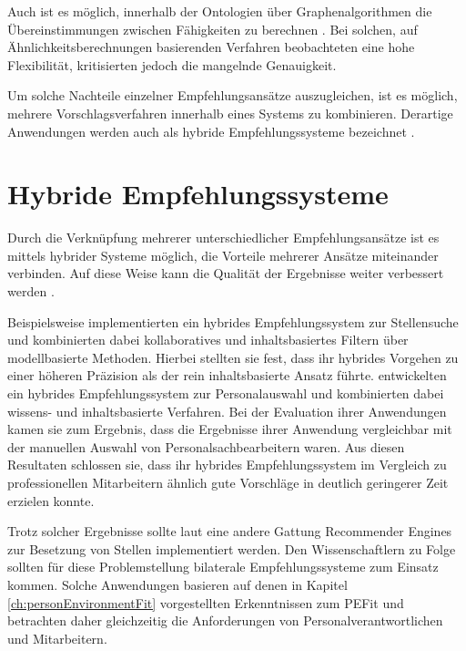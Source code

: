 Auch ist es möglich, innerhalb der Ontologien über Graphenalgorithmen die Übereinstimmungen zwischen Fähigkeiten zu berechnen \cite[S. 1f.]{balachander:2018}. Bei solchen, auf Ähnlichkeitsberechnungen basierenden Verfahren beobachteten \textcite[S. 4]{bianchini:2008} eine hohe Flexibilität, kritisierten jedoch die mangelnde Genauigkeit.

Um solche Nachteile einzelner Empfehlungsansätze auszugleichen, ist es möglich, mehrere Vorschlagsverfahren innerhalb eines Systems zu kombinieren. Derartige Anwendungen werden auch als hybride Empfehlungssysteme bezeichnet \cite[S. 200]{recommenderSystems:2016}.

\section{Hybride Empfehlungssysteme}
\label{ch:empfehlungssysteme:hybrideEmpfehlungssysteme}
Durch die Verknüpfung mehrerer unterschiedlicher Empfehlungsansätze ist es mittels hybrider Systeme möglich, die Vorteile mehrerer Ansätze miteinander verbinden. Auf diese Weise kann die Qualität der Ergebnisse weiter verbessert werden \cite[S. 199f.]{recommenderSystems:2016}\cite[S. 8]{malinowski:2008}.

Beispielsweise implementierten \textcite[S. 1ff.]{combiningCbAndCFCostSensitiveApproach:2017} ein hybrides Empfehlungssystem zur Stellensuche und kombinierten dabei kollaboratives und inhaltsbasiertes Filtern über modellbasierte Methoden. Hierbei stellten sie fest, dass ihr hybrides Vorgehen zu einer höheren Präzision als der rein inhaltsbasierte Ansatz führte. \textcite[S. 1ff.]{mohamed:2018} entwickelten ein hybrides Empfehlungssystem zur Personalauswahl und kombinierten dabei wissens- und inhaltsbasierte Verfahren. Bei der Evaluation ihrer Anwendungen kamen sie zum Ergebnis, dass die Ergebnisse ihrer Anwendung vergleichbar mit der manuellen Auswahl von Personalsachbearbeitern waren. Aus diesen Resultaten schlossen sie, dass ihr hybrides Empfehlungssystem im Vergleich zu professionellen Mitarbeitern ähnlich gute Vorschläge in deutlich geringerer Zeit erzielen konnte.

Trotz solcher Ergebnisse sollte laut \textcite[S. 1ff.]{malinowski:2006} eine andere Gattung Recommender Engines zur Besetzung von Stellen implementiert werden. Den Wissenschaftlern zu Folge sollten für diese Problemstellung bilaterale Empfehlungssysteme zum Einsatz kommen. Solche Anwendungen basieren auf denen in Kapitel \ref{ch:personEnvironmentFit} vorgestellten Erkenntnissen zum \ac{PEFit} und betrachten daher gleichzeitig die Anforderungen von Personalverantwortlichen und Mitarbeitern.
